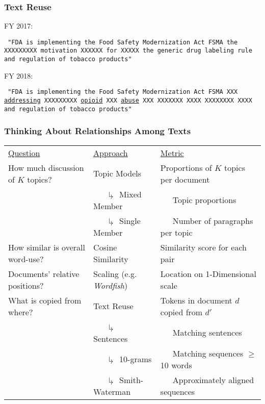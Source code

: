 \documentclass[10pt]{beamer}
\begin{document}
\begin{frame}
\frametitle{Text Reuse}
FY 2017:

\texttt{
"FDA is implementing the Food Safety Modernization Act FSMA the XXXXXXXXX motivation XXXXXX for 
XXXXX the generic drug labeling rule and regulation of tobacco products"}\\
\bigskip

FY 2018:

\texttt{
"FDA is implementing the Food Safety Modernization Act FSMA XXX \underline{addressing} XXXXXXXXX \underline{opioid} XXX 
\underline{abuse} XXX XXXXXXX XXXX XXXXXXXX XXXX and regulation of tobacco products"}

\end{frame}



\begin{frame}
\frametitle{Thinking About Relationships Among Texts}
\footnotesize
\begin{table}[h!]
\begin{tabular}{@{\extracolsep{0pt}}lll} 
\underline{Question} & \underline{Approach} & \underline{Metric}\\
How much discussion of $K$ topics? & Topic Models & Proportions of $K$ topics per document\\
& \ \ \ $\drsh$ Mixed Member & \ \ \ Topic proportions\\
& \ \ \ $\drsh$ Single Member & \ \ \ Number of paragraphs per topic \\
How similar is overall word-use? & Cosine Similarity & Similarity score for each pair \\
Documents' relative positions? & Scaling (e.g. \textit{\textit{\textit{Wordfish}}}) & Location on 1-Dimensional scale\\
What is copied from where? & Text Reuse & Tokens in document $d$ copied from $d'$\\
& \ \ \ $\drsh$ Sentences & \ \ \ Matching sentences\\
& \ \ \ $\drsh$  10-grams & \ \ \ Matching sequences $\geq$ 10 words\\
& \ \ \ $\drsh$  Smith-Waterman & \ \ \ Approximately aligned sequences
\end{tabular}
\end{table}
\end{frame}
\end{document}
